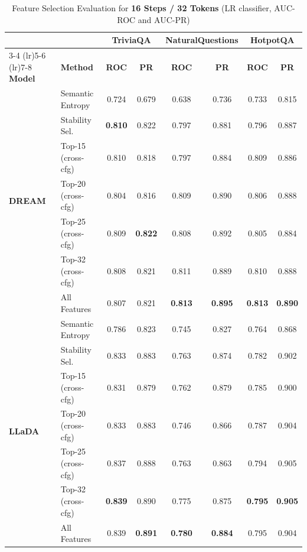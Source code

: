 \documentclass{article}
\begin{document}
\begin{table}[htbp]
\centering
\small
\caption{Feature Selection Evaluation for \textbf{16 Steps / 32 Tokens} (LR classifier, AUC-ROC and AUC-PR)}
\label{tab:fs_16steps_32tokens}
\begin{tabular}{llcccccc}
\toprule
 & & \multicolumn{2}{c}{\textbf{TriviaQA}} & \multicolumn{2}{c}{\textbf{NaturalQuestions}} & \multicolumn{2}{c}{\textbf{HotpotQA}} \\
\cmidrule(lr){3-4} \cmidrule(lr){5-6} \cmidrule(lr){7-8}
\textbf{Model} & \textbf{Method} & \textbf{ROC} & \textbf{PR} & \textbf{ROC} & \textbf{PR} & \textbf{ROC} & \textbf{PR} \\
\midrule
\multirow{7}{*}{\textbf{DREAM}}
 & Semantic Entropy & 0.724 & 0.679 & 0.638 & 0.736 & 0.733 & 0.815 \\
 \cmidrule(lr){2-8}
 & Stability Sel. & \textbf{0.810} & 0.822 & 0.797 & 0.881 & 0.796 & 0.887 \\
 & Top-15 (cross-cfg) & 0.810 & 0.818 & 0.797 & 0.884 & 0.809 & 0.886 \\
 & Top-20 (cross-cfg) & 0.804 & 0.816 & 0.809 & 0.890 & 0.806 & 0.888 \\
 & Top-25 (cross-cfg) & 0.809 & \textbf{0.822} & 0.808 & 0.892 & 0.805 & 0.884 \\
 & Top-32 (cross-cfg) & 0.808 & 0.821 & 0.811 & 0.889 & 0.810 & 0.888 \\
 & All Features & 0.807 & 0.821 & \textbf{0.813} & \textbf{0.895} & \textbf{0.813} & \textbf{0.890} \\
\midrule
\multirow{7}{*}{\textbf{LLaDA}}
 & Semantic Entropy & 0.786 & 0.823 & 0.745 & 0.827 & 0.764 & 0.868 \\
 \cmidrule(lr){2-8}
 & Stability Sel. & 0.833 & 0.883 & 0.763 & 0.874 & 0.782 & 0.902 \\
 & Top-15 (cross-cfg) & 0.831 & 0.879 & 0.762 & 0.879 & 0.785 & 0.900 \\
 & Top-20 (cross-cfg) & 0.833 & 0.883 & 0.746 & 0.866 & 0.787 & 0.904 \\
 & Top-25 (cross-cfg) & 0.837 & 0.888 & 0.763 & 0.863 & 0.794 & 0.905 \\
 & Top-32 (cross-cfg) & \textbf{0.839} & 0.890 & 0.775 & 0.875 & \textbf{0.795} & \textbf{0.905} \\
 & All Features & 0.839 & \textbf{0.891} & \textbf{0.780} & \textbf{0.884} & 0.795 & 0.904 \\
\bottomrule
\end{tabular}
\end{table}
\newpage
\end{document}
